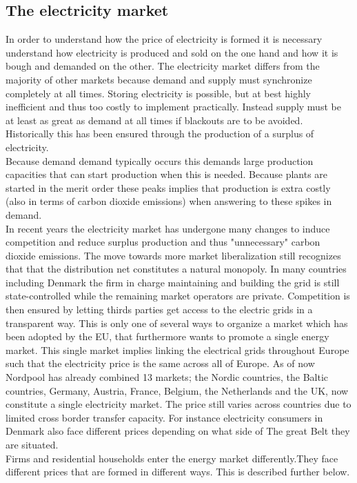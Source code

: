\label{sec:theory}

\subsection{The electricity market}
\label{subsec:t_market}
In order to understand how the price of electricity is formed it is necessary understand how electricity is produced and sold on the one hand and how it is bough and demanded on the other. The electricity market differs from the majority of other markets because demand and supply must synchronize completely at all times. Storing electricity is possible, but at best highly inefficient and thus too costly to implement practically. Instead supply must be at least as great as demand at all times if blackouts are to be avoided. Historically this has been ensured through the production of a surplus of electricity. \smallskip\\

Because demand demand typically occurs this demands large production capacities that can start production when this is needed. Because plants are started in the merit order these peaks implies that production is extra costly (also in terms of carbon dioxide emissions) when answering to these spikes in demand. 
\smallskip\\

In recent years the electricity market has undergone many changes to induce competition and reduce surplus production and thus "unnecessary" carbon dioxide emissions. The move towards more market liberalization still recognizes that that the distribution net constitutes a natural monopoly. In many countries including Denmark the firm in charge maintaining and building the grid is still state-controlled while the remaining market operators are private. Competition is then ensured by letting thirds parties get access to the electric grids in a transparent way. This is only one of several ways to organize a market which has been adopted by the EU, that furthermore wants to promote a single energy market. This single market  implies linking the electrical grids throughout Europe such that the electricity price is the same across all of Europe. As of now Nordpool has already combined 13 markets; the Nordic countries, the Baltic countries, Germany, Austria, France, Belgium, the Netherlands and the UK, now constitute a single electricity market. The price still varies across countries due to limited cross border transfer capacity. For instance electricity consumers in Denmark also face different prices depending on what side of The great Belt they are situated. \cite{https://www.nordpoolgroup.com/the-power-market/Integrated-Europe/} \smallskip \\
Firms and residential households enter the energy market differently.They face different prices that are formed in different ways. This is described further below.  

